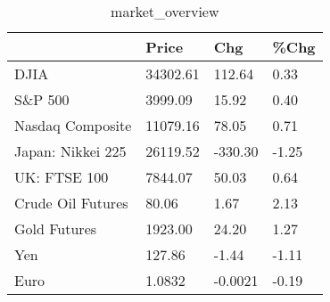 \documentclass{article}%
\begin{document}
%


\begin{table}[htbp]%
\caption{market\_overview}%
\centering%
\begin{adjustbox}{width=1\textwidth}%
\begin{tabular}{llll}
\toprule
                  &    Price &     Chg &  \%Chg \\
\midrule
             DJIA & 34302.61 &  112.64 &  0.33 \\
          S\&P 500 &  3999.09 &   15.92 &  0.40 \\
 Nasdaq Composite & 11079.16 &   78.05 &  0.71 \\
Japan: Nikkei 225 & 26119.52 & -330.30 & -1.25 \\
     UK: FTSE 100 &  7844.07 &   50.03 &  0.64 \\
Crude Oil Futures &    80.06 &    1.67 &  2.13 \\
     Gold Futures &  1923.00 &   24.20 &  1.27 \\
              Yen &   127.86 &   -1.44 & -1.11 \\
             Euro &   1.0832 & -0.0021 & -0.19 \\
\bottomrule
\end{tabular}
%
\end{adjustbox}%
\end{table}

%
\end{document}
